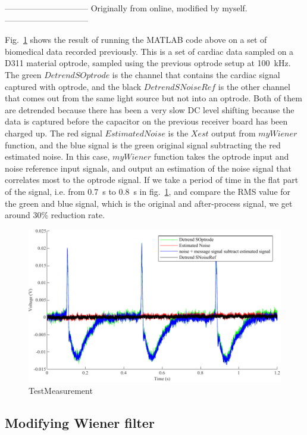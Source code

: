 ------------------------------
Originally from online, modified by myself.
------------------------------

Fig.~\ref{fig_TestMeasurement} shows the result of running the MATLAB code above on a set of biomedical data recorded previously.  This is a set of cardiac data sampled on a D311 material optrode, sampled using the previous optrode setup at \qty{100}{kHz}.  The green $Detrend SOptrode$ is the channel that contains the cardiac signal captured with optrode, and the black $ Detrend SNoiseRef$ is the other channel that comes out from the same light source but not into an optrode.  Both of them are detrended because there has been a very slow DC level shifting because the data is captured before the capacitor on the previous receiver board has been charged up.  The red signal $Estimated Noise$ is the $Xest$ output from $myWiener$ function, and the blue signal is the green original signal subtracting the red estimated noise.  In this case, $myWiener$ function takes the optrode input and noise reference input signals, and output an estimation of the noise signal that correlates most to the optrode signal.  If we take a period of time in the flat part of the signal, i.e. from \qty{0.7}{s} to \qty{0.8}{s} in fig.~\ref{fig_TestMeasurement}, and compare the RMS value for the green and blue signal, which is the original and after-process signal, we get around 30\% reduction rate.  

\begin{figure}[h]
\centering
\includegraphics[width=1\linewidth]{4-ANC_Sys/TestMeasurement.pdf}
\caption{TestMeasurement}
\label{fig_TestMeasurement}
\end{figure}

\subsection{Modifying Wiener filter}

